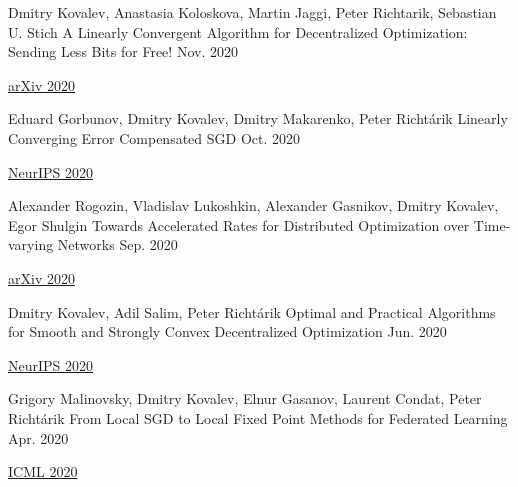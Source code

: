 
\begin{cventries}
	
\cventry
{Dmitry Kovalev, Anastasia Koloskova, Martin Jaggi, Peter Richtarik, Sebastian U. Stich} %
{A Linearly Convergent Algorithm for Decentralized Optimization: Sending Less Bits for Free!} %
{} %
{Nov. 2020} %
{ %
	\begin{cvitems}
		\item {\href{https://arxiv.org/abs/2011.01697}{arXiv 2020}}		
	\end{cvitems}
}	
	
\cventry
{Eduard Gorbunov, Dmitry Kovalev, Dmitry Makarenko, Peter Richtárik} %
{Linearly Converging Error Compensated SGD} %
{} %
{Oct. 2020} %
{ %
	\begin{cvitems}
		\item {\href{https://papers.nips.cc/paper/2020/hash/ef9280fbc5317f17d480e4d4f61b3751-Abstract.html}{NeurIPS 2020}}		
	\end{cvitems}
}	

\cventry
{Alexander Rogozin, Vladislav Lukoshkin, Alexander Gasnikov, Dmitry Kovalev, Egor Shulgin} %
{Towards Accelerated Rates for Distributed Optimization over Time-varying Networks} %
{} %
{Sep. 2020} %
{ %
	\begin{cvitems}
		\item {\href{https://arxiv.org/abs/2009.11069}{arXiv 2020}}		
	\end{cvitems}
}	

\cventry
{Dmitry Kovalev, Adil Salim, Peter Richtárik} %
{Optimal and Practical Algorithms for Smooth and Strongly Convex Decentralized Optimization} %
{} %
{Jun. 2020} %
{ %
	\begin{cvitems}
		\item {\href{https://papers.nips.cc/paper/2020/hash/d530d454337fb09964237fecb4bea6ce-Abstract.html}{NeurIPS 2020}}		
	\end{cvitems}
}	
	
	
\cventry
{Grigory Malinovsky, Dmitry Kovalev, Elnur Gasanov, Laurent Condat, Peter Richtárik} %
{From Local SGD to Local Fixed Point Methods for Federated Learning} %
{} %
{Apr. 2020} %
{ %
	\begin{cvitems}
		\item {\href{https://proceedings.icml.cc/paper/2020/hash/53fdae58e861476b182b0cd6beade809-Abstract.html}{ICML 2020}}		
	\end{cvitems}
}	
	

\end{cventries}
